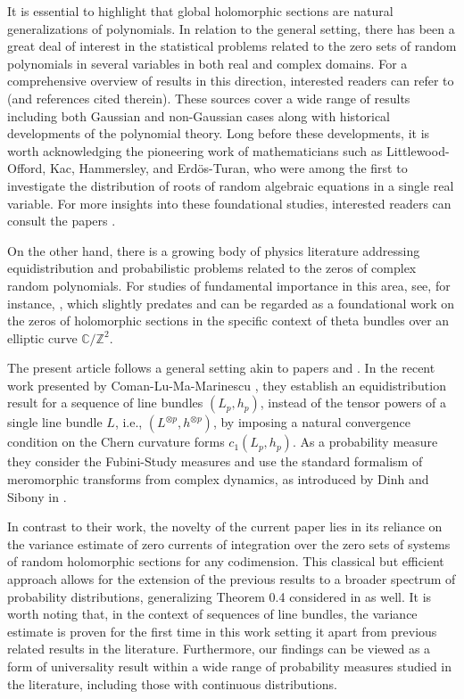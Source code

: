 \documentclass[11pt,leqno,oneside]{amsart}
\numberwithin{equation}{section}
\begin{document}
It is essential to highlight that global holomorphic sections are natural generalizations of polynomials. In relation to the general setting, there has been a great deal of interest in the statistical problems related to the zero sets of random polynomials in several variables in both real and complex domains.  For a comprehensive overview of results in this direction, interested readers can refer to \cite{BloomL, BloomS, BL05, BloomD, EDKO, ROJ, SHSM, HN08, IZ, Gnyz1} (and references cited therein). These sources cover a wide range of results including both Gaussian and non-Gaussian cases along with historical developments of the polynomial theory. Long before these developments, it is worth acknowledging the pioneering work of mathematicians such as Littlewood-Offord, Kac, Hammersley, and Erd\"{o}s-Turan, who were among the first to investigate the distribution of roots of random algebraic equations in a single real variable. For more insights into these foundational studies, interested readers can consult the papers \cite{KAC, LO, HAM56, ET}.

On the other hand, there is a growing body of physics literature addressing equidistribution and probabilistic problems related to the zeros of complex random polynomials. For studies of fundamental importance in this area, see, for instance, \cite{NV98}, which slightly predates \cite{SZ99} and can be regarded as a foundational work on the zeros of holomorphic sections in the specific context of theta bundles over an elliptic curve $\mathbb{C}/\mathbb{Z}^{2}$.



The present article follows a general setting akin to papers \cite{CLMM} and \cite{CMM}. In the recent work presented by Coman-Lu-Ma-Marinescu \cite{CLMM}, they establish an equidistribution result for a sequence of line bundles $(L_{p}, h_{p})$, instead of the tensor powers of a single line bundle $L$, i.e., $(L^{\otimes p}, h^{\otimes p})$, by imposing a natural convergence condition on the Chern curvature forms $c_{1}(L_{p}, h_{p}).$ As a probability measure they consider the  Fubini-Study measures and use the standard formalism of meromorphic transforms from complex dynamics, as introduced by Dinh and Sibony in \cite{DS06}.

 In contrast to their work, the novelty of the current paper lies in its reliance on the variance estimate of zero currents of integration over the zero sets of systems of random holomorphic  sections for any codimension. This classical but efficient approach allows for the extension of the previous results to a broader spectrum of probability distributions, generalizing Theorem 0.4 considered in \cite{CLMM} as well. It is worth noting that, in the context of sequences of line bundles, the variance estimate is proven for the first time in this work setting it apart from previous related results in the literature. Furthermore, our findings can be viewed as a form of universality result within a wide range of probability measures studied in the literature, including those with continuous distributions.
\end{document}
